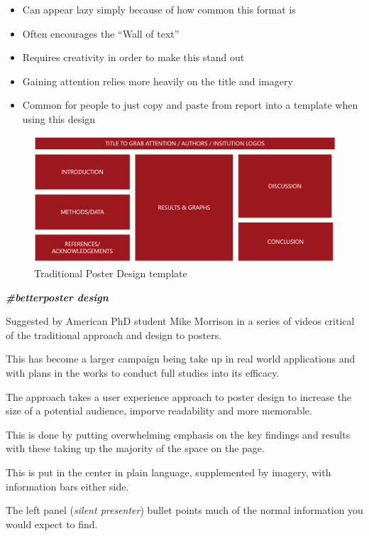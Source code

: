 \documentclass[
]{book}
\providecommand{\tightlist}{%
  \setlength{\itemsep}{0pt}\setlength{\parskip}{0pt}}
\begin{document}
\begin{itemize}
\tightlist
\item
  Can appear lazy simply because of how common this format is
\item
  Often encourages the ``Wall of text''
\item
  Requires creativity in order to make this stand out
\item
  Gaining attention relies more heavily on the title and imagery
\item
  Common for people to just copy and paste from report into a template when using this design
\end{itemize}

\begin{figure}
\centering
\includegraphics{img/Traditional Poster design template.png}
\caption{Traditional Poster Design template}
\end{figure}

\textbf{\emph{\#betterposter design}}

Suggested by American PhD student Mike Morrison in a series of videos critical of the traditional approach and design to posters.

This has become a larger campaign being take up in real world applications and with plans in the works to conduct full studies into its efficacy.

The approach takes a user experience approach to poster design to increase the size of a potential audience, imporve readability and more memorable.

This is done by putting overwhelming emphasis on the key findings and results with these taking up the majority of the space on the page.

This is put in the center in plain language, supplemented by imagery, with information bars either side.

The left panel (\emph{silent presenter}) bullet points much of the normal information you would expect to find.
\end{document}
